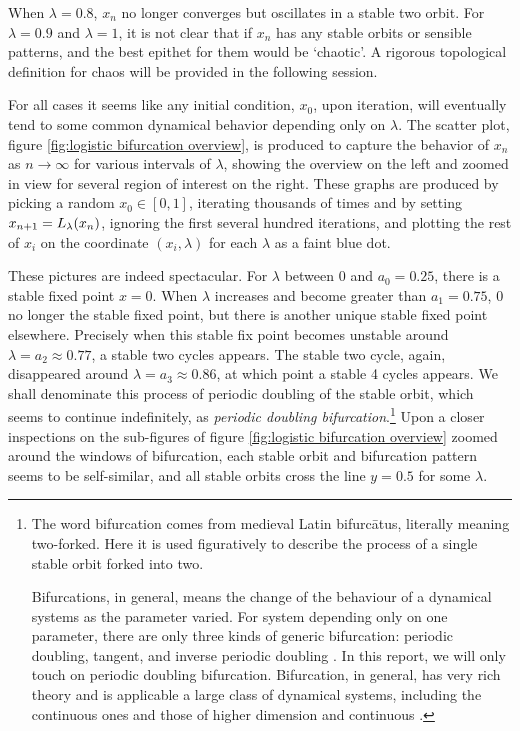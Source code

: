 When $\lambda = 0.8$, $x_n$ no longer converges but oscillates in a stable two orbit. 
For $\lambda = 0.9$ and $\lambda = 1$, it is not clear that if $x_n$ has any stable orbits or sensible patterns, and the best epithet for them would be `chaotic'.
A rigorous topological definition for chaos will be provided in the following session. 

For all cases it seems like any initial condition, $x_0$, upon iteration, will eventually tend to some common dynamical behavior depending only on $\lambda$.
The scatter plot, figure \ref{fig:logistic bifurcation overview}, is produced to capture the behavior of $x_n$ as $n \rightarrow \infty$ for various intervals of $\lambda$, showing the overview on the left and zoomed in view for several region of interest on the right.
These graphs are produced by picking a random $x_0 \in [0,1]$, iterating thousands of times and by setting $x_{n+1} = L_{\lambda}(x_n)$, ignoring the first several hundred iterations, and plotting the rest of $x_i$ on the coordinate $(x_i, \lambda)$ for each $\lambda$ as a faint blue dot.

These pictures are indeed spectacular. 
For $\lambda$ between $0$ and $a_0 = 0.25$, there is a stable fixed point $x = 0$.
When $\lambda$ increases and become greater than $a_1 = 0.75$, $0$ no longer the stable fixed point, but there is another unique stable fixed point elsewhere.
Precisely when this stable fix point becomes unstable around $\lambda = a_2 \approx 0.77$, a stable two cycles appears.
The stable two cycle, again, disappeared around $\lambda = a_3 \approx 0.86$, at which point a stable 4 cycles appears. 
We shall denominate this process of periodic doubling of the stable orbit, which seems to continue indefinitely, as \emph{periodic doubling bifurcation}.\footnote{
	The word bifurcation comes from medieval Latin bifurcātus, literally meaning two-forked.
	Here it is used figuratively to describe the process of a single stable orbit forked into two.
	
	Bifurcations, in general, means the change of the behaviour of a dynamical systems as the parameter varied.
	For system depending only on one parameter, there are only three kinds of generic bifurcation: periodic doubling, tangent, and inverse periodic doubling \cite{Chaos_in_DS}.
	In this report, we will only touch on periodic doubling bifurcation.
	Bifurcation, in general, has very rich theory and is applicable a large class of dynamical systems, including the continuous ones and those of higher dimension and continuous  \cite{dynamical_systems_v}.
}
Upon a closer inspections on the sub-figures of figure \ref{fig:logistic bifurcation overview} zoomed around the windows of bifurcation, each stable orbit and bifurcation pattern seems to be self-similar, and all stable orbits cross the line $y = 0.5$ for some $\lambda$.

